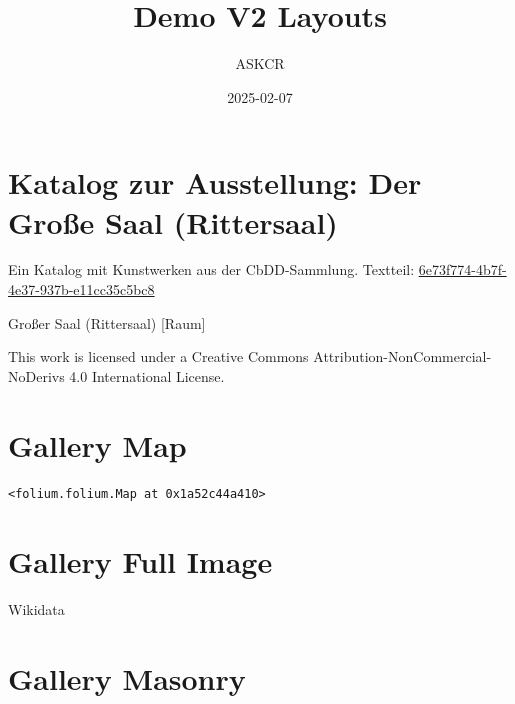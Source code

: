 \documentclass[
  a4paper,
]{book}
\title{Demo V2 Layouts}
\author{ASKCR}
\date{2025-02-07}
\renewcommand*\contentsname{Inhaltsverzeichnis}
\newcommand\contentsname{Inhaltsverzeichnis}
\begin{document}
\frontmatter
\maketitle

\renewcommand*\contentsname{Inhaltsverzeichnis}
{
\setcounter{tocdepth}{2}
\tableofcontents
}

\mainmatter
{}

\chapter{Katalog zur Ausstellung: Der Große Saal
(Rittersaal)}\label{katalog-zur-ausstellung-der-grouxdfe-saal-rittersaal}

Ein Katalog mit Kunstwerken aus der CbDD-Sammlung. Textteil:
\href{https://www.deckenmalerei.eu/42d06165-58e7-4653-bfe4-3d5f7091fc33\#6e73f774-4b7f-4e37-937b-e11cc35c5bc8}{6e73f774-4b7f-4e37-937b-e11cc35c5bc8}

Großer Saal (Rittersaal) {[}Raum{]}

This work is licensed under a Creative Commons
Attribution-NonCommercial-NoDerivs 4.0 International License.


\chapter{Gallery Map}\label{gallery-map}

\begin{verbatim}
<folium.folium.Map at 0x1a52c44a410>
\end{verbatim}


\chapter{Gallery Full Image}\label{gallery-full-image}

\label{infogrid}
\label{paintingName}

\label{paintingYear}

\label{paintingSize}{} {Wikidata}


\chapter{Gallery Masonry}\label{gallery-masonry}
\end{document}
